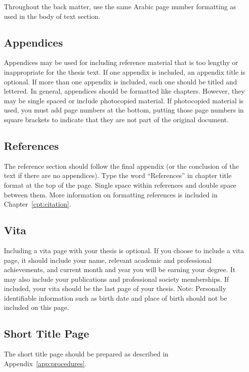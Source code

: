 Throughout the back matter, use the same Arabic page number formatting as used
in the body of text section.

\subsection{Appendices}

Appendices may be used for including reference material that is too lengthy or
inappropriate for the thesis text.  If one appendix is included, an appendix
title is optional.  If more than one appendix is included, each one should be
titled and lettered.  In general, appendices should be formatted like chapters.
However, they may be single spaced or include photocopied material.  If
photocopied material is used, you must add page numbers at the bottom, putting
those page numbers in square brackets to indicate that they are not part of the
original document.

\subsection{References}

The reference section should follow the final appendix (or the conclusion of
the text if there are no appendices).  Type the word ``References'' in chapter
title format at the top of the page.  Single space within references and double
space between them.  More information on formatting references is included in
Chapter~\ref{cpt:citation}.

\subsection{Vita}

Including a vita page with your thesis is optional.  If you choose to include a vita
page, it should include your name, relevant academic and professional achievements,
and current month and year you will be earning your degree.  It may also include your
publications and professional society memberships.  If included, your vita should be the 
last page of your thesis.  Note: Personally identifiable information such as birth date
and place of birth should not be included on this page.

\subsection{Short Title Page}

The short title page should be prepared as described in
Appendix~\ref{app:procedures}.

\fi

